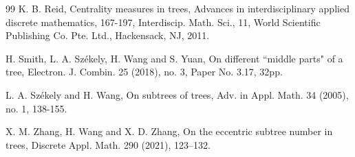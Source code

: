\documentclass[11pt]{article}
\begin{document}
\begin{thebibliography}{99}
 K. B. Reid, Centrality measures in trees, Advances in interdisciplinary applied discrete mathematics, 167-197, Interdiscip. Math. Sci., 11, World Scientific Publishing Co. Pte. Ltd., Hackensack, NJ, 2011.

 H. Smith, L. A. Sz\'ekely, H. Wang and S. Yuan, On different ``middle parts" of a tree, Electron. J. Combin. 25 (2018), no. 3, Paper No. 3.17, 32pp.

  L. A. Sz\'ekely and H. Wang, On subtrees of trees, Adv. in Appl. Math. 34 (2005), no. 1, 138-155. 

 X. M. Zhang, H. Wang and X. D. Zhang, On the eccentric subtree number in trees, Discrete Appl. Math. 290 (2021), 123–132. 

\end{thebibliography}
\end{document}
